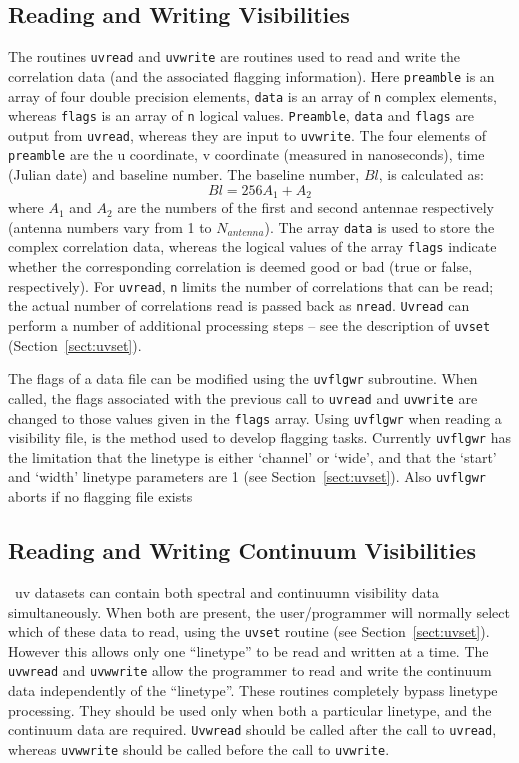 \subsection{Reading and Writing Visibilities}
The routines {\tt uvread} and {\tt uvwrite} are routines used to read and
write the correlation data (and the associated flagging information).
Here {\tt preamble} is an array of four double precision elements, {\tt data}
is an array of {\tt n} 
complex elements, whereas {\tt flags} is an array of {\tt n} logical values.
{\tt Preamble}, {\tt data} and {\tt flags} are output from {\tt uvread},
whereas they are input to {\tt uvwrite}. The four elements of
{\tt preamble} are the u coordinate, v coordinate (measured in nanoseconds),
time (Julian date) and baseline number. The baseline number, $Bl$, is
calculated  as:
\[
Bl = 256 A_1 + A_2
\]
where $A_1$ and $A_2$ are the numbers of the first and second antennae
respectively (antenna numbers vary from 1 to $N_{antenna}$). The array
{\tt data} is used to store the complex correlation data, whereas the logical
values of the array
{\tt flags} indicate whether the corresponding correlation is
deemed good or bad (true or false, respectively). For {\tt uvread}, {\tt n}
limits the number of correlations that can be read; the actual number of
correlations read is passed back as {\tt nread}. {\tt Uvread} can perform
a number of additional processing steps -- see the description of
{\tt uvset} (Section~\ref{sect:uvset}).

The flags of a data file can be modified using the {\tt uvflgwr} subroutine.
When called, the flags associated with the previous call to
{\tt uvread} and {\tt uvwrite} are changed to those values given in the
{\tt flags} array. Using {\tt uvflgwr} when reading a visibility file,
is the method used to develop flagging tasks. Currently {\tt uvflgwr}
has the limitation that the linetype is either `channel' or `wide', and that
the `start' and `width' linetype parameters are 1 (see
Section~\ref{sect:uvset}). Also {\tt uvflgwr}
aborts if no flagging file exists

\subsection{Reading and Writing Continuum Visibilities}
\miriad\ uv datasets can contain both spectral and continuumn visibility
data simultaneously. When both are present, the user/programmer will
normally select which of these data to read, using the {\tt uvset} routine
(see Section~\ref{sect:uvset}). However this allows only one ``linetype'' to be
read and written at a time. The {\tt uvwread} and {\tt uvwwrite} allow
the programmer to read and write the continuum data independently
of the ``linetype''. These routines completely bypass linetype processing.
They should be used only when both a particular linetype, and the continuum
data are required. {\tt Uvwread} should be called after the call to
{\tt uvread}, whereas {\tt uvwwrite} should be called before the call to
{\tt uvwrite}.

